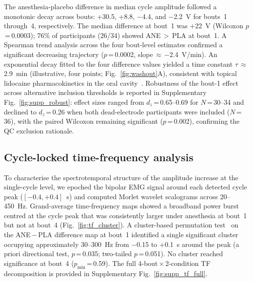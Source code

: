 The anesthesia-placebo difference in median cycle amplitude followed a
monotonic decay across bouts: +30.5, +8.8, $-$4.4, and $-$2.2~\textmu{}V
for bouts~1 through~4, respectively.
The median difference at bout~1 was +22~\textmu{}V (Wilcoxon $p$\,=\,0.0003);
76\% of participants (26/34) showed ANE\,$>$\,PLA at bout~1.
A Spearman trend analysis across the four bout-level estimates confirmed a
significant decreasing trajectory ($p$\,=\,0.0002, slope\,$\approx$\,$-$2.4~\textmu{}V/min).
An exponential decay fitted to the four difference values yielded a time
constant $\tau$\,$\approx$\,2.9~min (illustrative, four points;
Fig.~\ref{fig:washout}A), consistent with topical lidocaine pharmacokinetics
in the oral cavity~\cite{vonGunten2019}.
Robustness of the bout-1 effect across alternative inclusion thresholds is
reported in Supplementary Fig.~\ref{fig:supp_robust}: effect sizes
ranged from $d_z$\,=\,0.65--0.69 for $N$\,=\,30--34 and declined to
$d_z$\,=\,0.26 when both dead-electrode participants were included ($N$\,=\,36),
with the paired Wilcoxon remaining significant ($p$\,=\,0.002),
confirming the QC exclusion rationale.

\subsection*{Cycle-locked time-frequency analysis}

To characterise the spectrotemporal structure of the amplitude increase at the
single-cycle level, we epoched the bipolar EMG signal around each detected cycle
peak ($[-0.4, +0.4]$~s) and computed Morlet wavelet scalograms across 20--450~Hz.
Grand-average time-frequency maps showed a broadband power burst centred at the
cycle peak that was consistently larger under anesthesia at bout~1 but not at
bout~4 (Fig.~\ref{fig:tf_cluster}).
A cluster-based permutation test~\cite{Maris2007} on the
ANE\,$-$\,PLA difference map at bout~1 identified a single significant cluster
occupying approximately 30--300~Hz from $-$0.15 to +0.1~s around the peak
(a priori directional test, $p$\,=\,0.035; two-tailed $p$\,=\,0.051).
No cluster reached significance at bout~4 ($p_{\min}$\,=\,0.59).
The full 4-bout\,$\times$\,2-condition TF decomposition is provided in
Supplementary Fig.~\ref{fig:supp_tf_full}.

